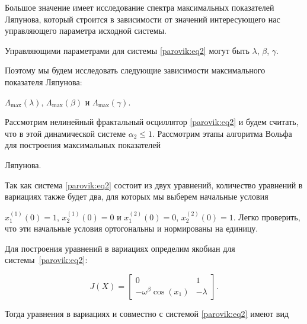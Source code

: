 Большое значение имеет исследование спектра максимальных показателей Ляпунова, который строится в зависимости от значений интересующего нас управляющего параметра исходной системы. 

Управляющими параметрами для системы \eqref{parovik:eq2} могут быть $\lambda$, $\beta$, $\gamma $.  

Поэтому мы будем исследовать следующие зависимости максимального показателя Ляпунова: 

${\Lambda _{\max }}( \lambda )$, ${\Lambda _{\max }}( \beta  )$ и ${\Lambda _{\max }}(\gamma  )$.



Рассмотрим нелинейный фрактальный осциллятор \eqref{parovik:eq2} и будем считать, что в этой динамической системе ${\alpha _2} \le 1$. Рассмотрим этапы алгоритма Вольфа для построения максимальных показателей

Ляпунова.



Так как система \eqref{parovik:eq2} состоит из двух уравнений, количество уравнений в вариациях также будет два, для которых мы выберем начальные условия 

$x_1^{(1)}( 0 ) = 1$, $x_2^{(1)}( 0 ) = 0$ и $x_1^{(2)}(0 ) = 0$, $x_2^{(2)}( 0 ) = 1$. Легко проверить, что эти начальные условия ортогональны и нормированы на единицу.



Для построения уравнений в вариациях определим якобиан для системы~\eqref{parovik:eq2}:

\[

J\left( X \right) = \left[ {\begin{array}{*{20}{c}} 0&1\\ { - {\omega ^\beta }\cos ( {{x_1}} )}&{ - \lambda } \end{array}} \right].

\]

Тогда уравнения в вариациях и совместно с системой \eqref{parovik:eq2} имеют вид

